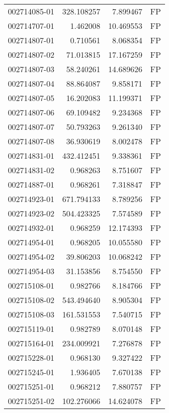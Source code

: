 \begin{tabular}{lrrl}
002714085-01 &  328.108257 &       7.899467 &   FP \\
002714707-01 &    1.462008 &      10.469553 &   FP \\
002714807-01 &    0.710561 &       8.068354 &   FP \\
002714807-02 &   71.013815 &      17.167259 &   FP \\
002714807-03 &   58.240261 &      14.689626 &   FP \\
002714807-04 &   88.864087 &       9.858171 &   FP \\
002714807-05 &   16.202083 &      11.199371 &   FP \\
002714807-06 &   69.109482 &       9.234368 &   FP \\
002714807-07 &   50.793263 &       9.261340 &   FP \\
002714807-08 &   36.930619 &       8.002478 &   FP \\
002714831-01 &  432.412451 &       9.338361 &   FP \\
002714831-02 &    0.968263 &       8.751607 &   FP \\
002714887-01 &    0.968261 &       7.318847 &   FP \\
002714923-01 &  671.794133 &       8.789256 &   FP \\
002714923-02 &  504.423325 &       7.574589 &   FP \\
002714932-01 &    0.968259 &      12.174393 &   FP \\
002714954-01 &    0.968205 &      10.055580 &   FP \\
002714954-02 &   39.806203 &      10.068242 &   FP \\
002714954-03 &   31.153856 &       8.754550 &   FP \\
002715108-01 &    0.982766 &       8.184766 &   FP \\
002715108-02 &  543.494640 &       8.905304 &   FP \\
002715108-03 &  161.531553 &       7.540715 &   FP \\
002715119-01 &    0.982789 &       8.070148 &   FP \\
002715164-01 &  234.009921 &       7.276878 &   FP \\
002715228-01 &    0.968130 &       9.327422 &   FP \\
002715245-01 &    1.936405 &       7.670138 &   FP \\
002715251-01 &    0.968212 &       7.880757 &   FP \\
002715251-02 &  102.276066 &      14.624078 &   FP \\

\end{tabular}
